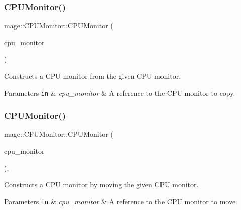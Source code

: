 \subsubsection{\texorpdfstring{C\+P\+U\+Monitor()}{CPUMonitor()}\hspace{0.1cm}{\footnotesize\ttfamily [2/3]}}
{\footnotesize\ttfamily mage\+::\+C\+P\+U\+Monitor\+::\+C\+P\+U\+Monitor (\begin{DoxyParamCaption}\item[{const \hyperlink{classmage_1_1_c_p_u_monitor}{C\+P\+U\+Monitor} \&}]{cpu\+\_\+monitor }\end{DoxyParamCaption})}

Constructs a C\+PU monitor from the given C\+PU monitor.


\begin{DoxyParams}[1]{Parameters}
\mbox{\tt in}  & {\em cpu\+\_\+monitor} & A reference to the C\+PU monitor to copy. \\
\hline
\end{DoxyParams}
\hypertarget{classmage_1_1_c_p_u_monitor_a415f77c86323428f233f955249f5b252}{}\label{classmage_1_1_c_p_u_monitor_a415f77c86323428f233f955249f5b252} 
\subsubsection{\texorpdfstring{C\+P\+U\+Monitor()}{CPUMonitor()}\hspace{0.1cm}{\footnotesize\ttfamily [3/3]}}
{\footnotesize\ttfamily mage\+::\+C\+P\+U\+Monitor\+::\+C\+P\+U\+Monitor (\begin{DoxyParamCaption}\item[{\hyperlink{classmage_1_1_c_p_u_monitor}{C\+P\+U\+Monitor} \&\&}]{cpu\+\_\+monitor }\end{DoxyParamCaption})\hspace{0.3cm}{\ttfamily [default]}, {\ttfamily [noexcept]}}

Constructs a C\+PU monitor by moving the given C\+PU monitor.


\begin{DoxyParams}[1]{Parameters}
\mbox{\tt in}  & {\em cpu\+\_\+monitor} & A reference to the C\+PU monitor to move. \\
\hline
\end{DoxyParams}
\hypertarget{classmage_1_1_c_p_u_monitor_a597ea4b27675a22d3d66a1d817b26652}{}\label{classmage_1_1_c_p_u_monitor_a597ea4b27675a22d3d66a1d817b26652} 
